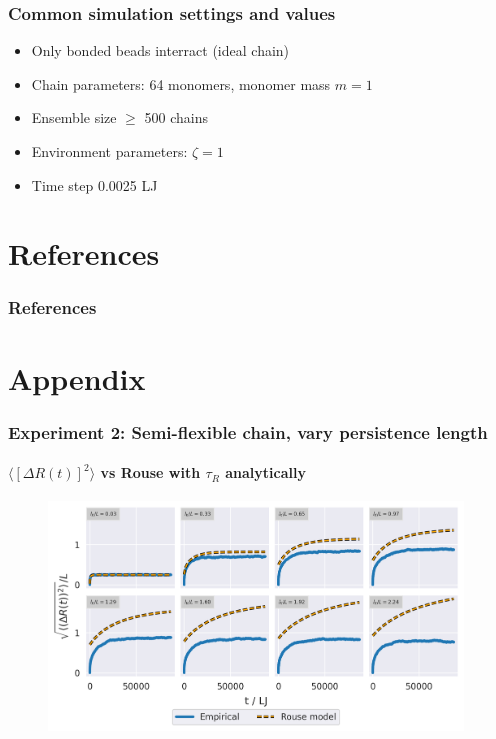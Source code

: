 \documentclass[handout]{beamer}
\newcommand{\mean}[1]{\langle #1 \rangle}
\begin{document}
\begin{frame}
    \frametitle{Common simulation settings and values}

    \begin{itemize}
        \item Only bonded beads interract (ideal chain)
        \item Chain parameters: 64 monomers, monomer mass $m=1$
        \item Ensemble size $ \ge $ 500 chains
        \item Environment parameters: $\zeta=1$
        \item Time step 0.0025 LJ
    \end{itemize}

\end{frame}

\section{References}

\begin{frame}
    \frametitle{References}
    
    
\end{frame}

\section{Appendix}

\begin{frame}
    \frametitle{Experiment 2: Semi-flexible chain, vary persistence length}
    \framesubtitle{$\mean{[\Delta R(t)]^2}$ vs Rouse with $\tau_R$ analytically}

    \begin{figure}[h]
        \includegraphics[width=11cm]{./4-exp-delta_R-rouse_anal.png}
    \end{figure}
\end{frame}
\end{document}
